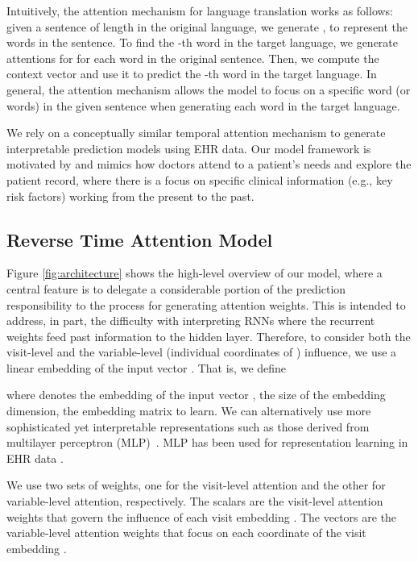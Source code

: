 Intuitively, the attention mechanism for language translation works as follows: given a sentence of length  in the original language, we generate , to represent the words in the sentence. To find the -th word in the target language, we generate attentions  for  for each word in the original sentence. Then, we compute the context vector  and use it to predict the -th word in the target language.  In general, the attention mechanism allows the model to focus on a specific word (or words) in the given sentence when generating each word in the target language. 

We rely on a conceptually similar temporal attention mechanism to generate interpretable prediction models using EHR data. Our model framework is motivated by and mimics how doctors attend to a patient’s needs and explore the patient record, where there is a focus on specific clinical information (e.g., key risk factors) working from the present to the past.


%
  
\subsection{Reverse Time Attention Model \alg}
\label{ssec:model}
Figure \ref{fig:architecture} shows the high-level overview of our model, where a central feature is to delegate a considerable portion of the prediction responsibility to the process for generating attention weights. This is intended to address, in part, the difficulty with interpreting RNNs where the recurrent weights feed past information to the hidden layer. Therefore, to consider both the visit-level and the variable-level (individual coordinates of ) influence, we use a linear embedding of the input vector .  That is, we define

\noindent where  denotes the embedding of the input vector ,  the size of the embedding dimension,  the embedding matrix to learn. We can alternatively use more sophisticated yet interpretable representations such as those derived from multilayer perceptron (MLP)~\cite{erhan2009visualizing,le2013building}. MLP has been used for representation learning in EHR data \cite{choi2016multi}.


We use two sets of weights, one for the visit-level attention and the other for variable-level attention, respectively. The scalars  are the visit-level attention weights that govern the influence of each visit embedding . The vectors  are the variable-level attention weights that focus on each coordinate of the visit embedding . 

